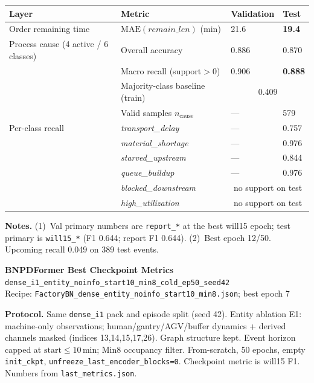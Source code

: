 \documentclass[10pt,a4paper]{article}
\begin{document}
\begin{center}
\begin{tabular}{l l l l}
\toprule
Layer & Metric & Validation & Test \\
\midrule
Order remaining time
  & $\mathrm{MAE}(\textit{remain\_len})$ (min)
  & 21.6
  & \textbf{19.4} \\
\midrule
Process cause (4 active / 6 classes)
  & Overall accuracy
  & 0.886
  & 0.870 \\
  & Macro recall (support${>}0$)
  & 0.906
  & \textbf{0.888} \\
  & Majority-class baseline (train)
  & \multicolumn{2}{c}{0.409} \\
  & Valid samples $n_{\mathrm{cause}}$
  & ---
  & 579 \\
\midrule
Per-class recall
  & \textit{transport\_delay}
  & --- & 0.757 \\
  & \textit{material\_shortage}
  & --- & 0.976 \\
  & \textit{starved\_upstream}
  & --- & 0.844 \\
  & \textit{queue\_buildup}
  & --- & 0.976 \\
  & \textit{blocked\_downstream}
  & \multicolumn{2}{c}{no support on test} \\
  & \textit{high\_utilization}
  & \multicolumn{2}{c}{no support on test} \\
\bottomrule
\end{tabular}
\end{center}

\small
\textbf{Notes.}
(1)~Val primary numbers are \texttt{report\_*} at the best will15 epoch; test primary is \texttt{will15\_*} (F1 0.644; report F1 0.644).
(2)~Best epoch 12/50. Upcoming recall 0.049 on 389 test events.

\clearpage
\begin{center}
{\LARGE\bfseries BNPDFormer Best Checkpoint Metrics}\\[3pt]
{\large\texttt{dense\_i1\_entity\_noinfo\_start10\_min8\_cold\_ep50\_seed42}}\\[2pt]
{\normalsize Recipe: \texttt{FactoryBN\_dense\_entity\_noinfo\_start10\_min8.json}; best epoch 7}
\end{center}

\textbf{Protocol.}
Same \texttt{dense\_i1} pack and episode split (seed 42).
Entity ablation E1: machine-only observations; human/gantry/AGV/buffer dynamics + derived channels masked (indices 13,14,15,17,26). Graph structure kept.
Event horizon capped at $\mathrm{start}\le 10$\,min; Min8 occupancy filter.
From-scratch, 50 epochs, empty \texttt{init\_ckpt}, \texttt{unfreeze\_last\_encoder\_blocks=0}.
Checkpoint metric is will15 F1.
Numbers from \texttt{last\_metrics.json}.
\end{document}
